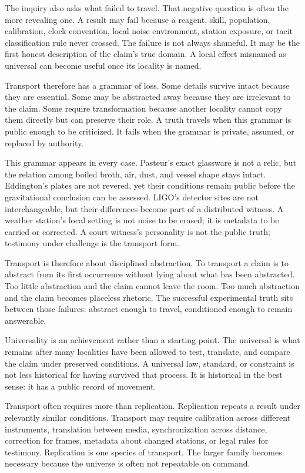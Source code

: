 \begin{chapteressay}
The inquiry also asks what failed to travel. That negative question is often
the more revealing one. A result may fail because a reagent, skill,
population, calibration, clock convention, local noise environment, station
exposure, or tacit classification rule never crossed. The failure is not
always shameful. It may be the first honest description of the claim's true
domain. A local effect misnamed as universal can become useful once its
locality is named.

Transport therefore has a grammar of loss. Some details survive intact because
they are essential. Some may be abstracted away because they are irrelevant
to the claim. Some require transformation because another locality cannot
copy them directly but can preserve their role. A truth travels when this
grammar is public enough to be criticized. It fails when the grammar is
private, assumed, or replaced by authority.

This grammar appears in every case. Pasteur's exact glassware is not a relic,
but the relation among boiled broth, air, dust, and vessel shape stays intact.
Eddington's plates are not revered, yet their conditions remain public before
the gravitational conclusion can be assessed. LIGO's detector sites are not
interchangeable, but their differences become part of a distributed witness.
A weather station's local setting is not noise to be erased; it is metadata
to be carried or corrected. A court witness's personality is not the public
truth; testimony under challenge is the transport form.

Transport is therefore about disciplined abstraction. To transport a claim
is to abstract from its first occurrence without lying about what has been
abstracted. Too little abstraction and the claim cannot leave the room. Too
much abstraction and the claim becomes placeless rhetoric. The successful
experimental truth sits between those failures: abstract enough to travel,
conditioned enough to remain answerable.

Universality is an achievement rather than a starting point. The universal
is what remains after many localities have been allowed to test, translate,
and compare the claim under preserved conditions. A universal law, standard,
or constraint is not less historical for having survived that process. It is
historical in the best sense: it has a public record of movement.

Transport often requires more than replication. Replication repeats a result
under relevantly similar conditions. Transport may require calibration across
different instruments, translation between media, synchronization across
distance, correction for frames, metadata about changed stations, or legal
rules for testimony. Replication is one species of transport. The larger
family becomes necessary because the universe is often not repeatable on
command.


\end{chapteressay}
